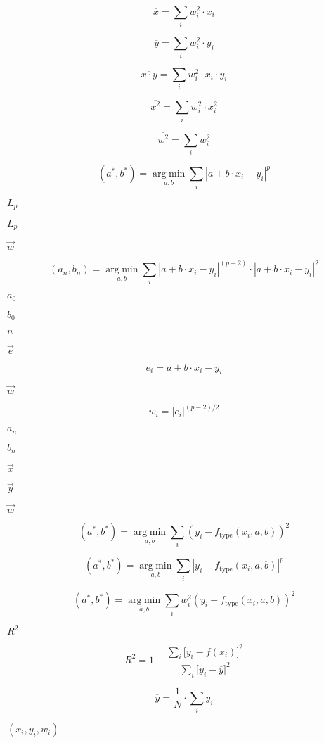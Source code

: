 \documentclass{article}
\begin{document}
\[ \overline{x}=\sum\limits_iw_i^2\cdot x_i \]
\pagebreak

\[ \overline{y}=\sum\limits_iw_i^2\cdot y_i \]
\pagebreak

\[ \overline{x\cdot y}=\sum\limits_iw_i^2\cdot x_i\cdot y_i \]
\pagebreak

\[ \overline{x^2}=\sum\limits_iw_i^2\cdot x_i^2 \]
\pagebreak

\[ \overline{w^2}=\sum\limits_iw_i^2 \]
\pagebreak

\[ (a^\ast,b^\ast)=\mathop{\mathrm{arg\;min}}\limits_{a,b}\sum\limits_i|a+b\cdot x_i-y_i|^p \]
\pagebreak

$ L_p $
\pagebreak

$ L_p$
\pagebreak

$ \vec{w} $
\pagebreak

\[ (a_n,b_n)=\mathop{\mathrm{arg\;min}}\limits_{a,b}\sum\limits_i|a+b\cdot x_i-y_i|^{(p-2)}\cdot|a+b\cdot x_i-y_i|^2 \]
\pagebreak

$ a_0$
\pagebreak

$ b_0$
\pagebreak

$ n$
\pagebreak

$\vec{e}$
\pagebreak

\[ e_i = a+b\cdot x_i -y_i \]
\pagebreak

$\vec{w}$
\pagebreak

\[ w_i=|e_i|^{(p-2)/2} \]
\pagebreak

$ a_n$
\pagebreak

$ b_n$
\pagebreak

$ \vec{x}$
\pagebreak

$ \vec{y}$
\pagebreak

$ \vec{w}$
\pagebreak

\[ (a^\ast, b^\ast)=\mathop{\mathrm{arg\;min}}\limits_{a,b}\sum\limits_i\left(y_i-f_{\text{type}}(x_i,a,b)\right)^2 \]
\pagebreak

\[ (a^\ast, b^\ast)=\mathop{\mathrm{arg\;min}}\limits_{a,b}\sum\limits_i|y_i-f_{\text{type}}(x_i,a,b)|^p \]
\pagebreak

\[ (a^\ast, b^\ast)=\mathop{\mathrm{arg\;min}}\limits_{a,b}\sum\limits_iw_i^2\left(y_i-f_{\text{type}}(x_i,a,b)\right)^2 \]
\pagebreak

$ R^2 $
\pagebreak

\[ R^2=1-\frac{\sum_i\bigl[y_i-f(x_i)\bigr]^2}{\sum_i\bigl[y_i-\overline{y}\bigr]^2} \]
\pagebreak

\[ \overline{y}=\frac{1}{N}\cdot\sum_iy_i \]
\pagebreak

$ (x_i,y_i,w_i) $
\pagebreak
\end{document}

